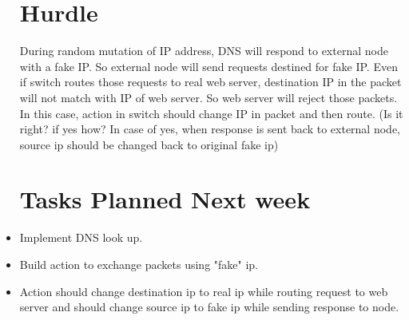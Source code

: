 \documentclass[letterpaper,twocolumn,10pt]{article}
\begin{document}
\begin{itemize}
\section{Hurdle}
During random mutation of IP address, DNS will respond to external node with a fake IP. So external node will send requests destined for fake IP. Even if switch routes those requests to real web server, destination IP in the packet will not match with IP of web server. So web server will reject those packets. In this case, action in switch should change IP in packet and then route. (Is it right? if yes how? In case of yes, when response is sent back to external node, source ip should be changed back to original fake ip)


\section{Tasks Planned Next week}
\item Implement DNS look up.
\item Build action to exchange packets using "fake" ip.
\item Action should change destination ip to real ip while routing request to web server and should change source ip to fake ip while sending response to node.

\end{itemize}

{
  \small 
  
  
}
\end{document}

